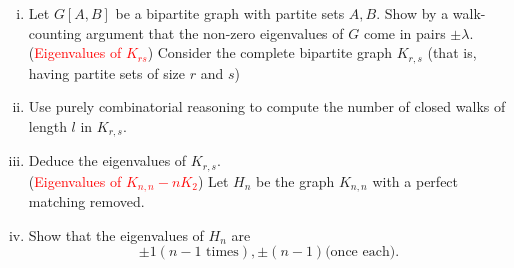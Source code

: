 \documentclass[11pt]{scrartcl}
\begin{document}
\begin{problem}[\textcolor{red}{Eigenvalues of some bipartite graphs}]
    \phantom{0}
    \begin{enumerate}[(i)]
        \item Let $G[A,B]$ be a bipartite graph with partite sets $A,B$. Show by a walk-counting argument that the non-zero eigenvalues of $G$ come in pairs $\pm \lambda$.\\
        (\textcolor{red}{Eigenvalues of $K_{rs}$}) Consider the complete bipartite graph $K_{r,s}$ (that is, having partite sets of size $r$ and $s$)
        \item Use purely combinatorial reasoning to compute the number of closed walks of length $l$ in $K_{r,s}$.
        \item Deduce the eigenvalues of $K_{r,s}$.\\
        (\textcolor{red}{Eigenvalues of $K_{n,n}-nK_2$}) Let $H_n$ be the graph $K_{n,n}$ with a perfect matching removed.
        \item Show that the eigenvalues of $H_n$ are \[\pm 1(n-1\text{ times}),\pm(n-1)\text{(once each)}.\]
    \end{enumerate}
\end{problem}
\end{document}

